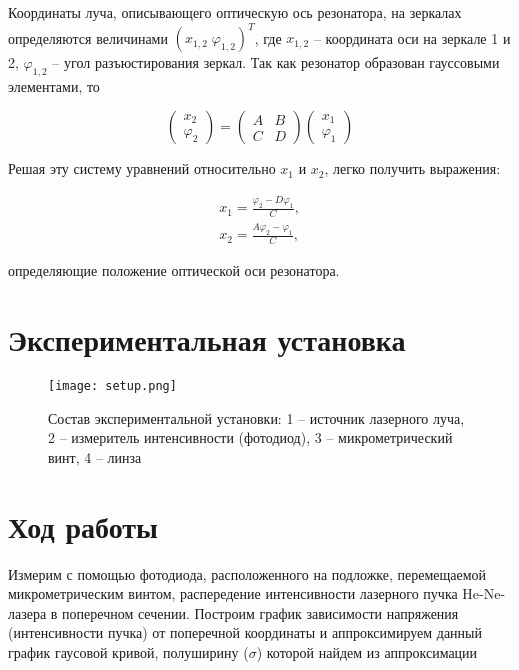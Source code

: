 \documentclass[a4paper,12pt]{article}
\begin{document}
Координаты луча, описывающего оптическую ось резонатора, на зеркалах определяются величинами $(x_{1,2}\; \varphi_{1,2})^T$, где $x_{1,2}$ -- координата оси на зеркале 1 и 2, $\varphi_{1,2}$ -- угол разъюстирования зеркал. Так как резонатор образован гауссовыми элементами, то

\begin{equation}
\begin{pmatrix}
    x_2\\
    \varphi_2
\end{pmatrix}
=
\begin{pmatrix}
    A & B\\
    C & D
\end{pmatrix}
\begin{pmatrix}
    x_1\\
    \varphi_1
\end{pmatrix}
\end{equation}

Решая эту систему уравнений относительно $x_1$ и $x_2$, легко получить выражения:

\begin{align}
    x_1 = \frac{\varphi_2 - D\varphi_1}{C},\\
    x_2 = \frac{A\varphi_2 - \varphi_1}{C},
\end{align}

определяющие положение оптической оси резонатора.

\pagebreak

\section{Экспериментальная установка}

\begin{figure}[h!]
\begin{center}
    \texttt{[image: setup.png]}
    \caption{Состав экспериментальной установки: 1 -- источник лазерного луча, 2 -- измеритель интенсивности (фотодиод), 3 -- микрометрический винт, 4 -- линза}
    \label{fig:setup}
\end{center}
\end{figure}

\section{Ход работы}

Измерим с помощью фотодиода, расположенного на подложке, перемещаемой микрометрическим винтом, распередение интенсивности лазерного пучка He-Ne-лазера в поперечном сечении. Построим график зависимости напряжения (интенсивности пучка) от поперечной координаты и аппроксимируем данный график гаусовой кривой, \linebreak полуширину  ($\sigma$) которой найдем из аппроксимации
\end{document}
